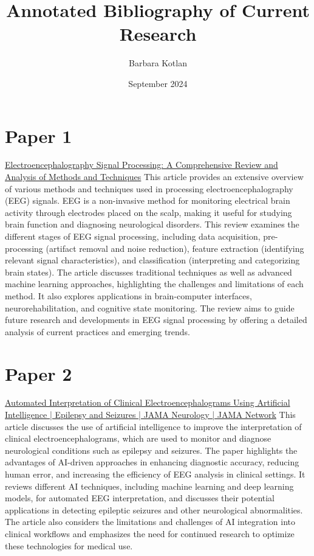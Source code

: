\documentclass[12pt]{article}
\title{Annotated Bibliography of Current Research}
\author{Barbara Kotlan}
\date{September 2024}
\begin{document}
\maketitle

\section{Paper 1}
\href{https://www.ncbi.nlm.nih.gov/pmc/articles/PMC10385593}{Electroencephalography Signal Processing: A Comprehensive Review and Analysis of Methods and Techniques}
This article provides an extensive overview of various methods and techniques used in processing electroencephalography (EEG) signals. EEG is a non-invasive method for monitoring electrical brain activity through electrodes placed on the scalp, making it useful for studying brain function and diagnosing neurological disorders. This review examines the different stages of EEG signal processing, including data acquisition, pre-processing (artifact removal and noise reduction), feature extraction (identifying relevant signal characteristics), and classification (interpreting and categorizing brain states). The article discusses traditional techniques as well as advanced machine learning approaches, highlighting the challenges and limitations of each method. It also explores applications in brain-computer interfaces, neurorehabilitation, and cognitive state monitoring. The review aims to guide future research and developments in EEG signal processing by offering a detailed analysis of current practices and emerging trends.

\section{Paper 2}
\href{https://jamanetwork.com/journals/jamaneurology/fullarticle/2806244}{Automated Interpretation of Clinical Electroencephalograms Using Artificial Intelligence | Epilepsy and Seizures | JAMA Neurology | JAMA Network}
This article discusses the use of artificial intelligence to improve the interpretation of clinical electroencephalograms, which are used to monitor and diagnose neurological conditions such as epilepsy and seizures. The paper highlights the advantages of AI-driven approaches in enhancing diagnostic accuracy, reducing human error, and increasing the efficiency of EEG analysis in clinical settings. It reviews different AI techniques, including machine learning and deep learning models, for automated EEG interpretation, and discusses their potential applications in detecting epileptic seizures and other neurological abnormalities. The article also considers the limitations and challenges of AI integration into clinical workflows and emphasizes the need for continued research to optimize these technologies for medical use.
\end{document}
